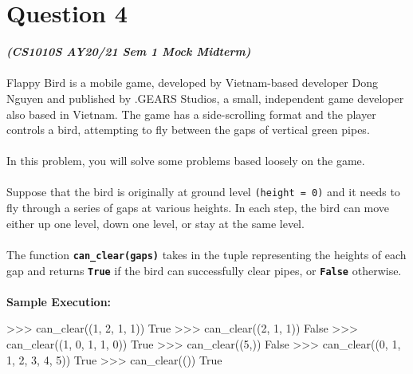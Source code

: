 \section{Question 4}
\textbf{\textit{(CS1010S AY20/21 Sem 1 Mock Midterm)}} \\ \\
Flappy Bird is a mobile game, developed by Vietnam-based developer Dong Nguyen and published by .GEARS Studios,
a small, independent game developer also based in Vietnam. The game has a side-scrolling format and the player 
controls a bird, attempting to fly between the gaps of vertical green pipes. \\ \\
In this problem, you will solve some problems based loosely on the game. \\ \\
Suppose that the bird is originally at ground level \texttt{(height = 0)} and it needs to fly through a series of gaps 
at various heights. In each step, the bird can move either up one level, down one level, or stay at the same 
level. \\ \\
The function \texttt{\bfseries can\_clear(gaps)} takes in the tuple representing the heights of each gap and
returns \texttt{\bfseries True} if the bird can successfully clear pipes, or \texttt{\bfseries False} otherwise. \\ \\
\textbf{Sample Execution:}
\begin{python}
>>> can_clear((1, 2, 1, 1))
True
>>> can_clear((2, 1, 1))
False
>>> can_clear((1, 0, 1, 1, 0))
True
>>> can_clear((5,))
False
>>> can_clear((0, 1, 1, 2, 3, 4, 5))
True
>>> can_clear(())
True
\end{python}
